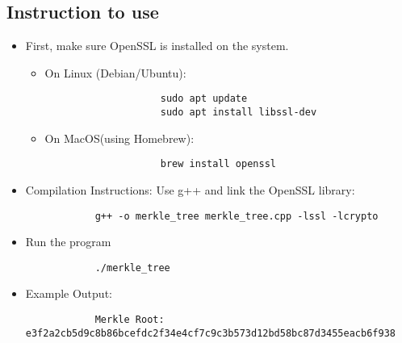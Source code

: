 \subsection{Instruction to use}
\begin{itemize}
    \item First, make sure OpenSSL is installed on the system.
        \begin{itemize}
            \item On Linux (Debian/Ubuntu):
                \begin{lstlisting}
                    sudo apt update
                    sudo apt install libssl-dev
                \end{lstlisting}
            \item On MacOS(using Homebrew):
                \begin{lstlisting}
                    brew install openssl
                \end{lstlisting}
        \end{itemize}
    \item Compilation Instructions: Use g++ and link the OpenSSL library:
        \begin{lstlisting}
            g++ -o merkle_tree merkle_tree.cpp -lssl -lcrypto
        \end{lstlisting}
    \item Run the program
        \begin{lstlisting}
            ./merkle_tree
        \end{lstlisting}
    \item Example Output:
        \begin{lstlisting}
            Merkle Root: e3f2a2cb5d9c8b86bcefdc2f34e4cf7c9c3b573d12bd58bc87d3455eacb6f938
        \end{lstlisting}
\end{itemize}